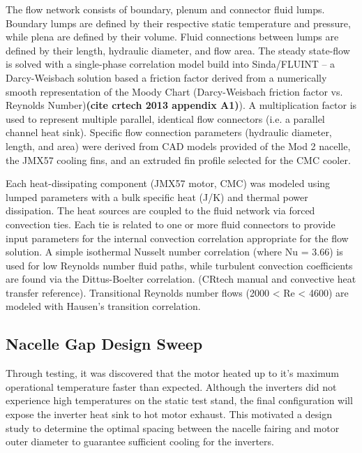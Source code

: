 \documentclass[]{aiaa-tc}%
\begin{document}
The flow network consists of boundary, plenum and connector fluid lumps.  Boundary lumps are defined by their respective static temperature and pressure, while plena are defined by their volume.  Fluid connections between lumps are defined by their length, hydraulic diameter, and flow area.  The steady state-flow is solved with a single-phase correlation model build into Sinda/FLUINT – a Darcy-Weisbach solution based a friction factor derived from a numerically smooth representation of the Moody Chart  (Darcy-Weisbach friction factor vs. Reynolds Number)\textbf{(cite crtech 2013 appendix A1)}).  A multiplication factor is used to represent multiple parallel, identical flow connectors (i.e. a parallel channel heat sink).  Specific flow connection parameters (hydraulic diameter, length, and area) were derived from CAD models provided of the Mod 2 nacelle, the JMX57 cooling fins, and an extruded fin profile selected for the CMC cooler.  

Each heat-dissipating component (JMX57 motor, CMC) was modeled using lumped parameters with a bulk specific heat (J/K) and thermal power dissipation.  The heat sources are coupled to the fluid network via forced convection ties.  Each tie is related to one or more fluid connectors to provide input parameters for the internal convection correlation appropriate for the flow solution.  A simple isothermal Nusselt number correlation (where Nu = 3.66) is used for low Reynolds number fluid paths, while turbulent convection coefficients are found via the Dittus-Boelter correlation. (CRtech manual and convective heat transfer reference).  Transitional Reynolds number flows (2000 < Re < 4600) are modeled with Hausen’s transition correlation. \cite{Kays}


\subsection{Nacelle Gap Design Sweep}

Through testing, it was discovered that the motor heated up to it's maximum operational temperature faster than expected. Although the inverters did not experience high temperatures on the static test stand, the final configuration will expose the inverter heat sink to hot motor exhaust. This motivated a design study to determine the optimal spacing between the nacelle fairing and motor outer diameter to guarantee sufficient cooling for the inverters.
\end{document}
